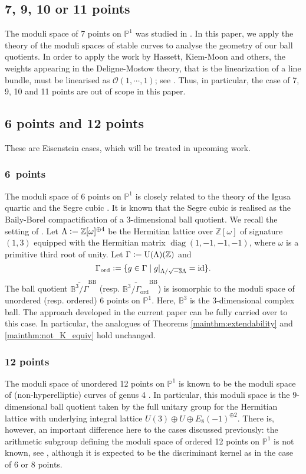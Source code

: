\documentclass[12pt, pdftex]{amsart}
\theoremstyle{plain}
\theoremstyle{definition}
\numberwithin{equation}{section}
\def\Z{{\mathbb Z}}
\def\P{{\mathbb P}}
\def\B{{\mathbb B}}
\def\id{\mathop{\mathrm{id}}\nolimits}
\def\diag{\mathop{\mathrm{diag}}\nolimits}
\def\ord{\mathrm{ord}}
\def\BB{\mathrm{BB}}
\def\OO{\mathscr{O}}
\def\U{\mathrm{U}}
\newcommand{\defeq}{\vcentcolon=}
\begin{document}
\subsection{7, 9, 10 or 11 points}
The moduli space of 7 points on $\P^1$ was studied in \cite{DvGK05}.
In this paper, we apply the theory of the moduli spaces of stable curves to analyse the geometry of our ball quotients.
In order to apply the work by Hassett, Kiem-Moon and others, the weights appearing in the Deligne-Mostow theory, that is the linearization of a line bundle, must be linearised as $\OO(1,\cdots,1)$; see \cite[Section 1]{KM11}.
Thus, in particular, the case of 7, 9, 10 and 11 points are out of scope in this paper.


\subsection{6 points and 12 points}

These are Eisenstein cases, which will be treated in upcoming work. 

\subsubsection{\rm{\textbf{6\ points}}}
The moduli space of 6 points on $\P^1$ is closely related to the theory of the Igusa quartic and the Segre cubic \cite{Ko13, Ko16, Ma01}.
It is known that the Segre cubic is realised as the Baily-Borel compactification of a 3-dimensional ball quotient. We recall the setting of \cite{Ko13}.
Let $\Lambda\defeq \Z[\omega]^{\oplus 4}$ be the Hermitian lattice over $\Z[\omega]$ of signature $(1,3)$ equipped with the Hermitian matrix $\diag(1,-1,-1,-1)$, where $\omega$ is a primitive third root of unity.
Let $\Gamma\defeq\U(\Lambda)(\Z)$ and 
\[\Gamma_{\ord}\defeq\{g\in\Gamma\mid g\vert_{\Lambda/\sqrt{-3}\Lambda}=\id\}.\]
The ball quotient $\overline{\B^3/\Gamma}^{\BB}$ (resp. $\overline{\B^3/\Gamma_{\ord}}^{\BB}$) is isomorphic to the moduli space of unordered (resp. ordered) 6 points on $\P^1$.
Here, $\B^3$ is the 3-dimensional complex ball.
The approach developed in the current paper can be fully carried over to this case. In particular, the analogues of Theorems \ref{mainthm:extendability} and    \ref{mainthm:not_K_equiv}
hold unchanged. 



\subsubsection{\rm{\textbf{12 points}}}
The moduli space of unordered 12 points on $\P^1$ is known to be the moduli space of (non-hyperelliptic) curves of genus 4 \cite{Ko02}.
In particular, this moduli space is the $9$-dimensional ball quotient taken by the full unitary group for the Hermitian lattice with underlying integral lattice $U(3)\oplus U\oplus E_8(-1)^{\oplus 2}$.
There is, however, an important difference here to the cases discussed previously: the arithmetic subgroup defining the moduli space of ordered 12 points on $\P^1$ is not known, see \cite{KoNote}, although it is expected to be the discriminant kernel as in the case of 6 or 8 points.
\end{document}
